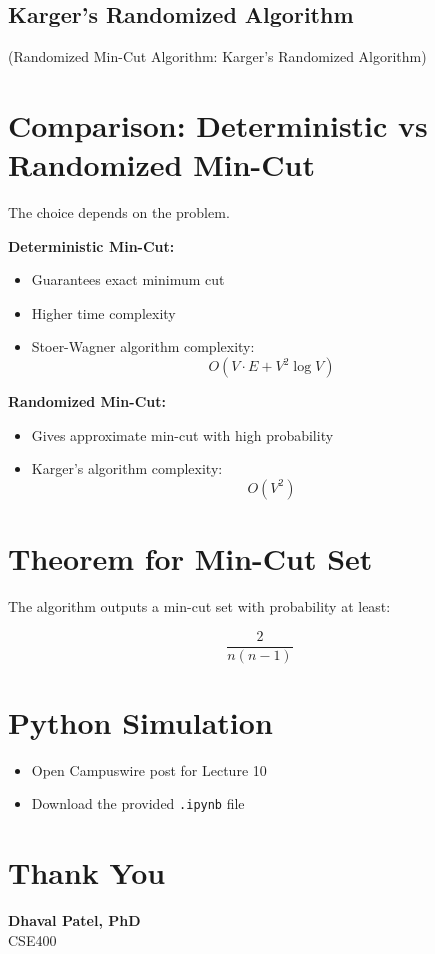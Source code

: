\documentclass[12pt]{article}
\begin{document}
\subsection*{Karger’s Randomized Algorithm}

(Randomized Min-Cut Algorithm: Karger’s Randomized Algorithm)

\section*{Comparison: Deterministic vs Randomized Min-Cut}

The choice depends on the problem.

\textbf{Deterministic Min-Cut:}
\begin{itemize}
    \item Guarantees exact minimum cut
    \item Higher time complexity
    \item Stoer-Wagner algorithm complexity:
    \[
    O(V \cdot E + V^2 \log V)
    \]
\end{itemize}

\textbf{Randomized Min-Cut:}
\begin{itemize}
    \item Gives approximate min-cut with high probability
    \item Karger’s algorithm complexity:
    \[
    O(V^2)
    \]
\end{itemize}

\section*{Theorem for Min-Cut Set}

The algorithm outputs a min-cut set with probability at least:

\[
\frac{2}{n(n-1)}
\]

\section*{Python Simulation}

\begin{itemize}
    \item Open Campuswire post for Lecture 10
    \item Download the provided \texttt{.ipynb} file
\end{itemize}

\section*{Thank You}

\textbf{Dhaval Patel, PhD}\\
CSE400
\end{document}
